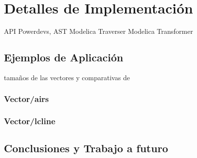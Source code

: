 \documentclass[a4paper,	11pt]{report}
\begin{document}
\chapter{Detalles de Implementación}
API Powerdevs, AST Modelica
Traverser
Modelica Transformer


\section{Ejemplos de Aplicación}
tamaños de las vectores y comparativas de 
\subsection{Vector/airs}
\subsection{Vector/lcline}
\nocite{*}
\section{Conclusiones y Trabajo a futuro}




\end{document}
